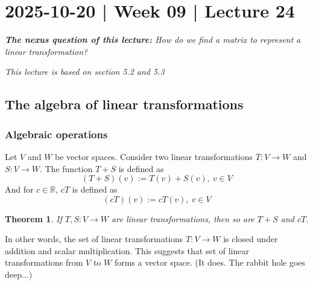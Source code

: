 \documentclass[10pt]{article}
\newtheorem{theorem}{Theorem}
\theoremstyle{definition}
\newcommand{\R}{\mathbb{R}}           %
\begin{document}
\section{2025-10-20 | Week 09 | Lecture 24}
\begin{center}
  \begin{tcolorbox}[width=0.9\textwidth, colback=white, colframe=black]
    \textit{\textbf{The nexus question of this lecture:} How do we find a
      matrix to represent a linear transformation?}
  \end{tcolorbox}
\end{center}
\textit{This lecture is based on section 5.2 and 5.3}


\subsection{The algebra of linear transformations}

\subsubsection{Algebraic operations}
Let $V$ and $W$ be vector spaces. Consider two linear transformations $T:V \to
W$ and $S:V \to W$. The function $T+S$ is defined as
\begin{equation*}
  (T+S)(v) := T(v)+S(v), \ v\in V
\end{equation*}
And for $c\in \R$, $cT$ is defined as
\begin{equation*}
  (cT)(v):=cT(v),\ v\in V
\end{equation*}

\begin{theorem}
  \label{thm:linear-combinations-of-linear-transformations}
  If $T,S:V \to W$ are linear transformations, then so are $T+S$ and $cT$.
\end{theorem}

In other words, the set of linear transformations $T:V\to W$ is closed under
addition and scalar multiplication. This suggests that set of linear
transformations from $V$ to $W$ forms a vector space. (It does. The rabbit
hole goes deep...)
\end{document}
